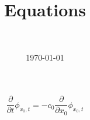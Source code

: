 \documentclass{article}
\title{Equations}
\author{\\ }
\date{\today}
\begin{document}
\maketitle
\begin{dmath}\frac{\partial}{\partial t} {\phi}_{x_{0},t} = - c_{0} 
\frac{\partial}{\partial x_{0}} {\phi}_{x_{0},t}\end{dmath}
\end{document}
